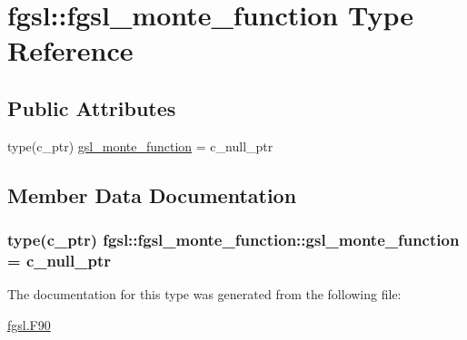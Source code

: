 \hypertarget{structfgsl_1_1fgsl__monte__function}{}\section{fgsl\+:\+:fgsl\+\_\+monte\+\_\+function Type Reference}
\label{structfgsl_1_1fgsl__monte__function}
\subsection*{Public Attributes}
\begin{DoxyCompactItemize}
\item 
type(c\+\_\+ptr) \hyperlink{structfgsl_1_1fgsl__monte__function_afb36c81cc5811938e740ccb264c7af51}{gsl\+\_\+monte\+\_\+function} = c\+\_\+null\+\_\+ptr
\end{DoxyCompactItemize}


\subsection{Member Data Documentation}
\hypertarget{structfgsl_1_1fgsl__monte__function_afb36c81cc5811938e740ccb264c7af51}{}
\subsubsection[{gsl\+\_\+monte\+\_\+function}]{\setlength{\rightskip}{0pt plus 5cm}type(c\+\_\+ptr) fgsl\+::fgsl\+\_\+monte\+\_\+function\+::gsl\+\_\+monte\+\_\+function = c\+\_\+null\+\_\+ptr}\label{structfgsl_1_1fgsl__monte__function_afb36c81cc5811938e740ccb264c7af51}


The documentation for this type was generated from the following file\+:\begin{DoxyCompactItemize}
\item 
\hyperlink{fgsl_8F90}{fgsl.\+F90}\end{DoxyCompactItemize}
